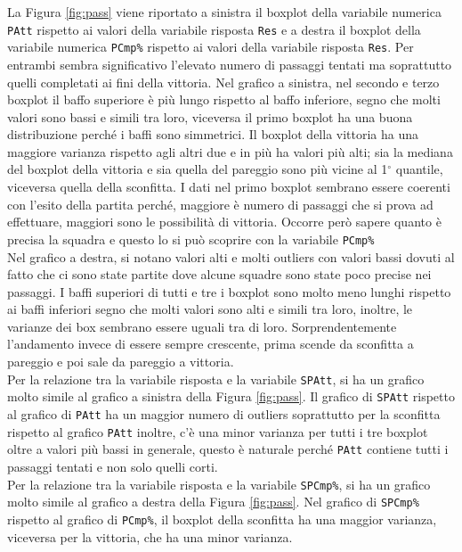 La Figura \ref{fig:pass} viene riportato a sinistra il boxplot della variabile numerica \texttt{PAtt} rispetto ai valori della variabile risposta \texttt{Res} e a destra il boxplot della variabile numerica \texttt{PCmp\%} rispetto ai valori della variabile risposta \texttt{Res}. Per entrambi sembra significativo l'elevato numero di passaggi tentati ma soprattutto quelli completati ai fini della vittoria. Nel grafico a sinistra, nel secondo e terzo boxplot il baffo superiore è più lungo rispetto al baffo inferiore, segno che molti valori sono bassi e simili tra loro, viceversa il primo boxplot ha una buona distribuzione perché i baffi sono simmetrici. Il boxplot della vittoria ha una maggiore varianza rispetto agli altri due e in più ha valori più alti; sia la mediana del boxplot della vittoria e sia quella del pareggio sono più vicine al 1$^{\circ}$ quantile, viceversa quella della sconfitta. I dati nel primo boxplot sembrano essere coerenti con l'esito della partita perché, maggiore è numero di passaggi che si prova ad effettuare, maggiori sono le possibilità di vittoria. Occorre però sapere quanto è precisa la squadra e questo lo si può scoprire con la variabile \texttt{PCmp\%}\\
Nel grafico a destra, si notano valori alti e molti outliers con valori bassi dovuti al fatto che ci sono state partite dove alcune squadre sono state poco precise nei passaggi. I baffi superiori di tutti e tre i boxplot sono molto meno lunghi rispetto ai baffi inferiori segno che molti valori sono alti e simili tra loro, inoltre, le varianze dei box sembrano essere uguali tra di loro. Sorprendentemente l'andamento invece di essere sempre crescente, prima scende da sconfitta a pareggio e poi sale da pareggio a vittoria.\\
Per la relazione tra la variabile risposta e la variabile \texttt{SPAtt}, si ha un grafico molto simile al grafico a sinistra della Figura \ref{fig:pass}. Il grafico di \texttt{SPAtt} rispetto al grafico di \texttt{PAtt} ha un maggior numero di outliers soprattutto per la sconfitta rispetto al grafico \texttt{PAtt} inoltre, c'è una minor varianza per tutti i tre boxplot oltre a valori più bassi in generale, questo è naturale perché \texttt{PAtt} contiene tutti i passaggi tentati e non solo quelli corti.\\
Per la relazione tra la variabile risposta e la variabile \texttt{SPCmp\%}, si ha un grafico molto simile al grafico a destra della Figura \ref{fig:pass}. Nel grafico di \texttt{SPCmp\%} rispetto al grafico di \texttt{PCmp\%}, il boxplot della sconfitta ha una maggior varianza, viceversa per la vittoria, che ha una minor varianza.\\
